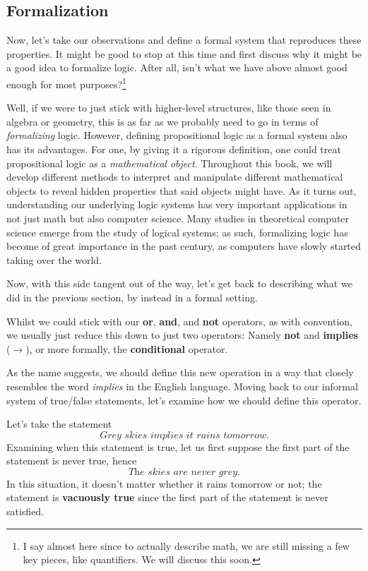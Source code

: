 \subsection{Formalization}
Now, let's take our observations and define a formal system that reproduces these properties.
It might be good to stop at this time and first discuss why it might be a good idea to formalize logic.
After all, isn't what we have above almost good enough for most purposes?\footnote{
I say almost here since to actually describe math, we are still missing a few key pieces, like quantifiers. We will discuss this soon.}

Well, if we were to just stick with higher-level structures,  like those seen in algebra or geometry, this is as far as we probably need to go in terms of \textit{formalizing} logic.
However, defining propositional logic as a formal system also has its advantages.
For one, by giving it a rigorous definition, one could treat propositional logic as a \textit{mathematical object}.
Throughout this book, we will develop different methods to interpret and manipulate different mathematical objects to reveal hidden properties that said objects might have.
As it turns out, understanding our underlying logic systems has very important applications in not just math but also computer science.
Many studies in theoretical computer science emerge from the study of logical systems; as such, formalizing logic has become of great importance in the past century, as computers have slowly started taking over the world.

Now, with this side tangent out of the way, let's get back to describing what we did in the previous section, by instead in a formal setting.

Whilst we could stick with our \textbf{or}, \textbf{and}, and \textbf{not} operators, as with convention, we usually just reduce this down to just two operators: Namely \textbf{not} and \textbf{implies} ($\to$), or more formally, the \textbf{conditional} operator.

As the name suggests, we should define this new operation in a way that closely resembles the word \textit{implies} in the English language.
Moving back to our informal system of true/false statements, let's examine how we should define this operator.

Let's take the statement
$$\textit{Grey skies implies it rains tomorrow}.$$
Examining when this statement is true, let us first suppose the first part of the statement is never true, hence
$$\textit{The skies are never grey}.$$
In this situation, it doesn't matter whether it rains tomorrow or not; the statement is \textbf{vacuously true} since the first part of the statement is never satisfied.

